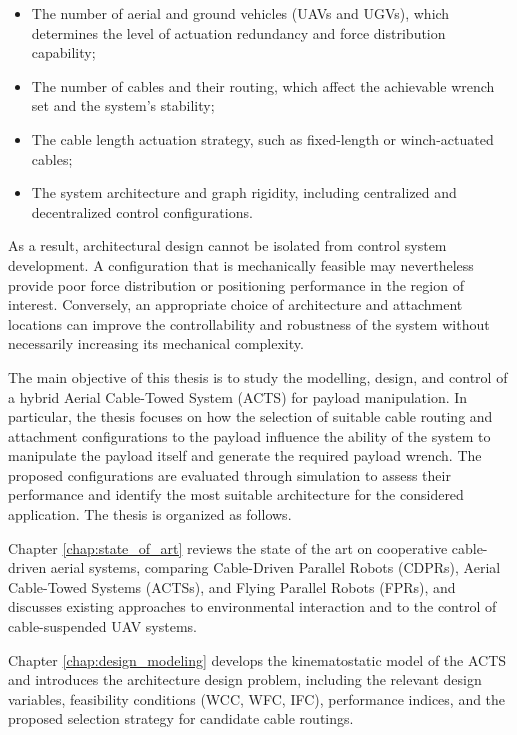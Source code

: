\begin{itemize}
    \item The number of aerial and ground vehicles (UAVs and UGVs), which determines the level of actuation redundancy and force distribution capability;
    \item The number of cables and their routing, which affect the achievable wrench set and the system's stability;
    \item The cable length actuation strategy, such as fixed-length or winch-actuated cables;
    \item The system architecture and graph rigidity, including centralized and decentralized control configurations.
\end{itemize}

As a result, architectural design cannot be isolated from control system development. A configuration that is mechanically feasible may nevertheless provide poor force distribution or positioning performance in the region of interest. Conversely, an appropriate choice of architecture and attachment locations can improve the controllability and robustness of the system without necessarily increasing its mechanical complexity.

The main objective of this thesis is to study the modelling, design, and control of a hybrid Aerial Cable-Towed System (ACTS) for payload manipulation. In particular, the thesis focuses on how the selection of suitable cable routing and attachment configurations to the payload influence the ability of the system to manipulate the payload itself and generate the required payload wrench. The proposed configurations are evaluated through simulation to assess their performance and identify the most suitable architecture for the considered application. 
The thesis is organized as follows.

Chapter \ref{chap:state_of_art} reviews the state of the art on cooperative cable-driven aerial systems, comparing Cable-Driven Parallel Robots (CDPRs), Aerial Cable-Towed Systems (ACTSs), and Flying Parallel Robots (FPRs), and discusses existing approaches to environmental interaction and to the control of cable-suspended UAV systems.

Chapter \ref{chap:design_modeling} develops the kinematostatic model of the ACTS and introduces the architecture design problem, including the relevant design variables, feasibility conditions (WCC, WFC, IFC), performance indices, and the proposed selection strategy for candidate cable routings.

